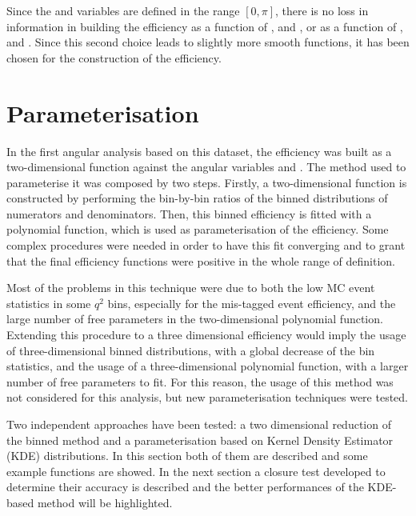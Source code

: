 
Since the \TK and \TL variables are defined in the range $[0,\pi]$, there is no loss in information in building the efficiency as a function of \TK, \TL and \PHI, or as a function of \cTK, \cTL and \PHI. Since this second choice leads to slightly more smooth functions, it has been chosen for the construction of the efficiency. 

\section{Parameterisation}\label{sec:eff_param}

In the first angular analysis based on this dataset, the efficiency was built as a two-dimensional function against the angular variables \TK and \TL.
The method used to parameterise it was composed by two steps.
Firstly, a two-dimensional function is constructed by performing the bin-by-bin ratios of the binned distributions of numerators and denominators.
Then, this binned efficiency is fitted with a polynomial function, which is used as parameterisation of the efficiency.
Some complex procedures were needed in order to have this fit converging and to grant that the final efficiency functions were positive in the whole range of definition.

Most of the problems in this technique were due to both the low MC event statistics in some $q^2$ bins, especially for the mis-tagged event efficiency, and the large number of free parameters in the two-dimensional polynomial function.
Extending this procedure to a three dimensional efficiency would imply the usage of three-dimensional binned distributions, with a global decrease of the bin statistics, and the usage of a three-dimensional polynomial function, with a larger number of free parameters to fit.
For this reason, the usage of this method was not considered for this analysis, but new parameterisation techniques were tested.

Two independent approaches have been tested: a two dimensional reduction of the binned method and a parameterisation based on Kernel Density Estimator (KDE) distributions.
In this section both of them are described and some example functions are showed.
In the next section a closure test developed to determine their accuracy is described and the better performances of the KDE-based method will be highlighted.

